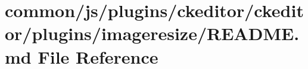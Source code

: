 \hypertarget{common_2js_2plugins_2ckeditor_2ckeditor_2plugins_2imageresize_2README_8md}{}\section{common/js/plugins/ckeditor/ckeditor/plugins/imageresize/\+R\+E\+A\+D\+M\+E.md File Reference}
\label{common_2js_2plugins_2ckeditor_2ckeditor_2plugins_2imageresize_2README_8md}
